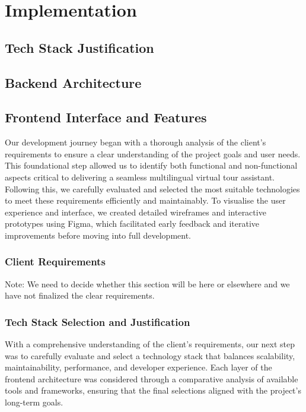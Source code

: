 \chapter{Implementation}
\section{Tech Stack Justification}
\section{Backend Architecture}
\section{Frontend Interface and Features}

Our development journey began with a thorough analysis of the client’s requirements to ensure a clear understanding of the project goals and user needs. This foundational step allowed us to identify both functional and non-functional aspects critical to delivering a seamless multilingual virtual tour assistant. Following this, we carefully evaluated and selected the most suitable technologies to meet these requirements efficiently and maintainably. To visualise the user experience and interface, we created detailed wireframes and interactive prototypes using Figma, which facilitated early feedback and iterative improvements before moving into full development.

\subsection{Client Requirements}

Note: We need to decide whether this section will be here or elsewhere and we have not finalized the clear requirements.

\subsection{Tech Stack Selection and Justification}

With a comprehensive understanding of the client's requirements, our next step was to carefully evaluate and select a technology stack that balances scalability, maintainability, performance, and developer experience. Each layer of the frontend architecture was considered through a comparative analysis of available tools and frameworks, ensuring that the final selections aligned with the project’s long-term goals.

